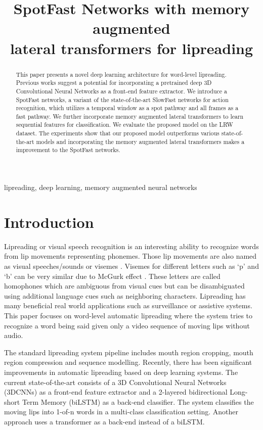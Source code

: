 \documentclass{article}
\title{SpotFast Networks with memory augmented \\ lateral transformers   for lipreading}
\begin{document}
\maketitle
\begin{abstract}
This paper presents a novel deep learning architecture for word-level lipreading. Previous works suggest a potential for incorporating a pretrained deep 3D Convolutional Neural Networks as a front-end feature extractor. We introduce a SpotFast networks, a variant of the state-of-the-art SlowFast networks for action recognition, which utilizes a temporal window as a spot pathway and all frames as a fast pathway. We further incorporate memory augmented lateral transformers to learn sequential features for classification. We evaluate the proposed model on the LRW dataset. The experiments show that our proposed model outperforms various state-of-the-art models and incorporating the memory augmented lateral transformers makes a  improvement to the SpotFast networks.
\end{abstract}
\begin{keywords}
lipreading, deep learning, memory augmented neural networks
\end{keywords}
\section{Introduction}
Lipreading or visual speech recognition is an interesting ability to recognize words from lip movements representing phonemes. Those lip movements are also named as visual speeches/sounds or visemes \cite{taylor2012dynamic, bear2017phoneme}. Visemes for different letters such as `p' and `b' can be very similar due to McGurk effect \cite{mcgurk1976hearing}. These letters are called homophones which are ambiguous from visual cues but can be disambiguated using additional language cues such as neighboring characters. Lipreading has many beneficial real world applications such as surveillance or assistive systems. This paper focuses on word-level automatic lipreading where the system tries to recognize a word being said given only a video sequence of moving lips without audio. 

The standard lipreading system pipeline includes mouth region cropping, mouth region compression and sequence modelling. Recently, there has been significant improvements in automatic lipreading based on deep learning systems. The current state-of-the-art \cite{weng2019learning, petridis2018end} consists of a 3D Convolutional Neural Networks (3DCNNs) as a front-end feature extractor and a 2-layered bidirectional Long-short Term Memory (biLSTM) as a back-end classifier. The system classifies the moving lips into 1-of-n words in a multi-class classification setting. Another approach \cite{Zhang_2019_ICCV} uses a transformer as a back-end instead of a biLSTM. 
\end{document}
